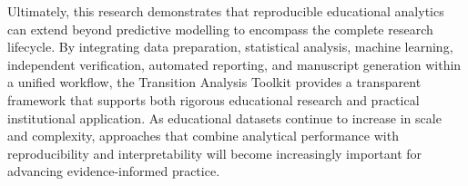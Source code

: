 Ultimately, this research demonstrates that reproducible educational analytics can extend beyond predictive modelling to encompass the complete research lifecycle. By 
integrating data preparation, statistical analysis, machine learning, independent verification, automated reporting, and manuscript generation within a unified workflow, 
the Transition Analysis Toolkit provides a transparent framework that supports both rigorous educational research and practical institutional application. As educational 
datasets continue to increase in scale and complexity, approaches that combine analytical performance with reproducibility and interpretability will become increasingly 
important for advancing evidence-informed practice.



\newpage